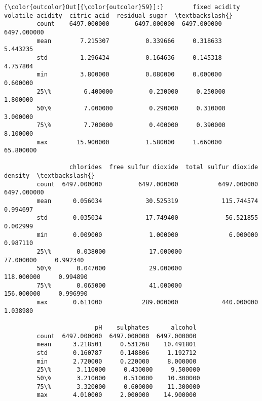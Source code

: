 \documentclass[11pt]{article}
\begin{document}
\begin{Verbatim}[commandchars=\\\{\}]
{\color{outcolor}Out[{\color{outcolor}59}]:}        fixed acidity  volatile acidity  citric acid  residual sugar  \textbackslash{}
         count    6497.000000       6497.000000  6497.000000     6497.000000   
         mean        7.215307          0.339666     0.318633        5.443235   
         std         1.296434          0.164636     0.145318        4.757804   
         min         3.800000          0.080000     0.000000        0.600000   
         25\%         6.400000          0.230000     0.250000        1.800000   
         50\%         7.000000          0.290000     0.310000        3.000000   
         75\%         7.700000          0.400000     0.390000        8.100000   
         max        15.900000          1.580000     1.660000       65.800000   
         
                  chlorides  free sulfur dioxide  total sulfur dioxide      density  \textbackslash{}
         count  6497.000000          6497.000000           6497.000000  6497.000000   
         mean      0.056034            30.525319            115.744574     0.994697   
         std       0.035034            17.749400             56.521855     0.002999   
         min       0.009000             1.000000              6.000000     0.987110   
         25\%       0.038000            17.000000             77.000000     0.992340   
         50\%       0.047000            29.000000            118.000000     0.994890   
         75\%       0.065000            41.000000            156.000000     0.996990   
         max       0.611000           289.000000            440.000000     1.038980   
         
                         pH    sulphates      alcohol  
         count  6497.000000  6497.000000  6497.000000  
         mean      3.218501     0.531268    10.491801  
         std       0.160787     0.148806     1.192712  
         min       2.720000     0.220000     8.000000  
         25\%       3.110000     0.430000     9.500000  
         50\%       3.210000     0.510000    10.300000  
         75\%       3.320000     0.600000    11.300000  
         max       4.010000     2.000000    14.900000  
\end{Verbatim}
            
\end{document}
